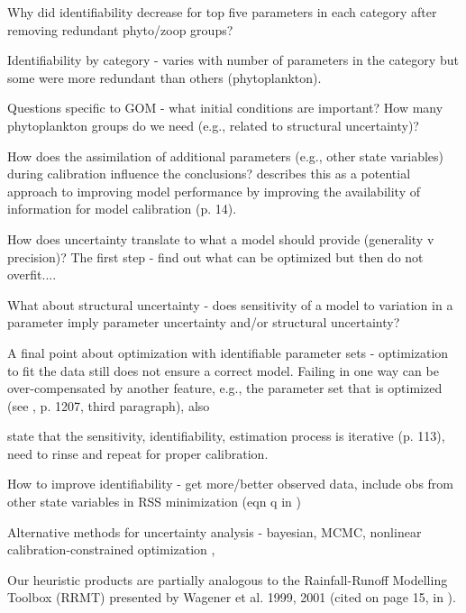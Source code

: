 \documentclass[letterpaper,12pt,oneside]{article}\usepackage[]{graphicx}\usepackage[]{color}
\begin{document}
Why did identifiability decrease for top five parameters in each category after removing redundant phyto/zoop groups?

Identifiability by category - varies with number of parameters in the category but some were more redundant than others (phytoplankton).  

Questions specific to GOM - what initial conditions are important? How many phytoplankton groups do we need (e.g., related to structural uncertainty)?

How does the assimilation of additional parameters (e.g., other state variables) during calibration influence the conclusions?  \citet{Wagener01} describes this as a potential approach to improving model performance by improving the availability of information for model calibration (p. 14).  

How does uncertainty translate to what a model should provide (generality v precision)?  The first step - find out what can be optimized but then do not overfit....

What about structural uncertainty - does sensitivity of a model to variation in a parameter imply parameter uncertainty and/or structural uncertainty?

A final point about optimization with identifiable parameter sets - optimization to fit the data still does not ensure a correct model.  Failing in one way can be over-compensated by another feature, e.g., the parameter set that is optimized (see \cite{Flynn05}, p. 1207, third paragraph), also \citep{Arhonditsis08}

\cite{Omlin01} state that the sensitivity, identifiability, estimation process is iterative (p. 113), need to rinse and repeat for proper calibration. 

How to improve identifiability - get more/better observed data, include obs from other state variables in RSS minimization (eqn q in \cite{Omlin01})

Alternative methods for uncertainty analysis - bayesian, MCMC, nonlinear calibration-constrained optimization \citep{Gallagher07}, \citep{Arhonditsis08}

Our heuristic products are partially analogous to the Rainfall-Runoff Modelling Toolbox (RRMT) presented by Wagener et al. 1999, 2001 (cited on page 15, in \citealt{Wagener01}).

\clearpage
\begin{singlespace}


\end{singlespace}
\clearpage
\end{document}
